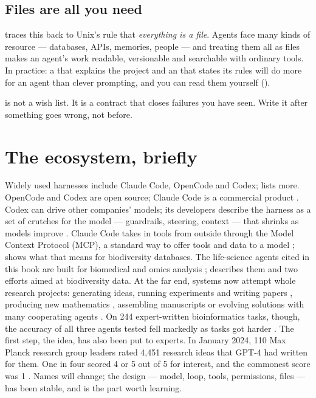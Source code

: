 \subsection{Files are all you need}

\textcite{piskala2026files} traces this back to Unix's rule that
\emph{everything is a file}. Agents face many kinds of resource --- databases,
APIs, memories, people --- and treating them all as files makes an agent's work
readable, versionable and searchable with ordinary tools. In practice: a
 that explains the project and an  that states
its rules will do more for an agent than clever prompting, and you can read them
yourself ().

\begin{keypoint}
 is not a wish list. It is a contract that closes failures you
have seen. Write it after something goes wrong, not before.
\end{keypoint}

\section{The ecosystem, briefly}

Widely used harnesses include Claude Code, OpenCode and Codex;
 lists more. OpenCode and Codex are open source; Claude
Code is a commercial product \parencite{liu2026claudecode}. Codex can drive
other companies' models; its
developers describe the harness as a set of crutches for the model ---
guardrails, steering, context --- that shrinks as models improve
\parencite{orosz2026codex}. Claude Code takes in tools from outside through
the Model Context Protocol (MCP), a standard way to offer tools and data to a
model \parencite{liu2026claudecode};  shows what that means
for biodiversity databases. The life-science agents cited in this book are built
for biomedical and omics analysis
\parencite{huang2025biomni,xu2026pantheonos,zeng2026omicclaw};
 describes them and two efforts aimed at biodiversity
data. At the far end, systems now attempt whole research
projects: generating ideas, running experiments and writing papers
\parencite{lu2026aiscientist}, producing new mathematics
\parencite{feng2026aletheia}, assembling manuscripts \parencite{song2026paperorchestra}
or evolving solutions with many cooperating agents \parencite{qu2026coral}. On
244 expert-written bioinformatics tasks, though, the accuracy of all three
agents tested fell markedly as tasks got harder \parencite{guo2026promptbio}.
The first step, the idea, has also been put to experts. In January 2024, 110
Max Planck research group leaders rated 4,451 research ideas that GPT-4 had
written for them. One in four scored 4 or 5 out of 5 for interest, and the
commonest score was 1 \parencite{gu2026scimuse}.
Names will change; the design --- model,
loop, tools, permissions, files --- has been stable, and is the part worth
learning.
